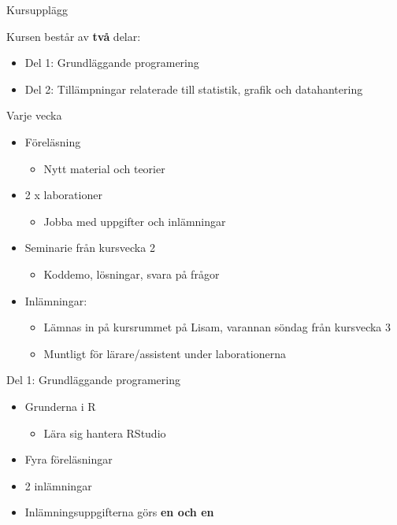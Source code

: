 \documentclass[
  10pt,
  ignorenonframetext,
]{beamer}
\providecommand{\tightlist}{%
  \setlength{\itemsep}{0pt}\setlength{\parskip}{0pt}}
\begin{document}
\begin{frame}{Kursupplägg}
\protect\hypertarget{kursuppluxe4gg}{}
\begin{block}{Kursen består av \textbf{två} delar:}
\protect\hypertarget{kursen-bestuxe5r-av-tvuxe5-delar}{}
\begin{itemize}
\tightlist
\item
  Del 1: Grundläggande programering
\item
  Del 2: Tillämpningar relaterade till statistik, grafik och
  datahantering
\end{itemize}

\pause
\end{block}

\begin{block}{Varje vecka}
\protect\hypertarget{varje-vecka}{}
\begin{itemize}
\tightlist
\item
  Föreläsning

  \begin{itemize}
  \tightlist
  \item
    Nytt material och teorier
  \end{itemize}
\item
  2 x laborationer

  \begin{itemize}
  \tightlist
  \item
    Jobba med uppgifter och inlämningar
  \end{itemize}
\item
  Seminarie från kursvecka 2

  \begin{itemize}
  \tightlist
  \item
    Koddemo, lösningar, svara på frågor
  \end{itemize}
\item
  Inlämningar:

  \begin{itemize}
  \tightlist
  \item
    Lämnas in på kursrummet på Lisam, varannan söndag från kursvecka 3
  \item
    Muntligt för lärare/assistent under laborationerna
  \end{itemize}
\end{itemize}
\end{block}
\end{frame}

\begin{frame}{Del 1: Grundläggande programering}
\protect\hypertarget{del-1-grundluxe4ggande-programering}{}
\begin{itemize}
\tightlist
\item
  Grunderna i R

  \begin{itemize}
  \tightlist
  \item
    Lära sig hantera RStudio
  \end{itemize}
\item
  Fyra föreläsningar
\item
  2 inlämningar
\item
  Inlämningsuppgifterna görs \textbf{en och en}
\end{itemize}
\end{frame}
\end{document}
